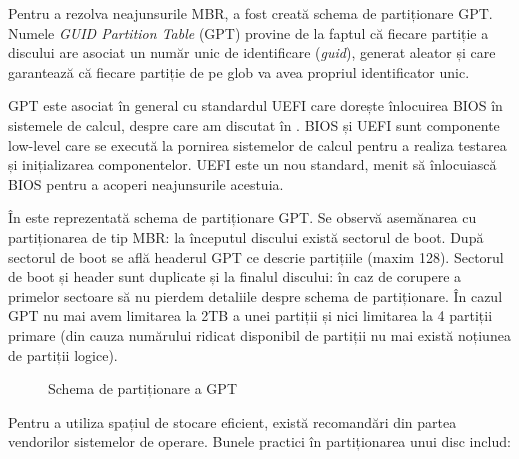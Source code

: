 Pentru a rezolva neajunsurile MBR, a fost creată schema de partiționare
GPT. Numele \textit{GUID Partition Table} (GPT) provine de la faptul că fiecare partiție a
discului are asociat un număr unic de identificare (\textit{guid}), generat aleator și
care garantează că fiecare partiție de pe glob va avea propriul identificator
unic.

GPT este asociat în general cu standardul UEFI care dorește înlocuirea
BIOS în sistemele de calcul, despre care am discutat în . BIOS și UEFI sunt componente low-level care
se execută la pornirea sistemelor de calcul pentru a realiza testarea și
inițializarea componentelor. UEFI este un nou standard, menit să înlocuiască
BIOS pentru a acoperi neajunsurile acestuia.

În  este reprezentată schema de
partiționare GPT. Se observă asemănarea cu partiționarea de tip MBR: la
începutul discului există sectorul de boot. După sectorul de boot se află headerul GPT ce descrie
partițiile (maxim 128). Sectorul de boot și header sunt duplicate și la finalul
discului: în caz de corupere a primelor sectoare să nu pierdem detaliile despre
schema de partiționare. În cazul GPT nu mai avem limitarea la 2TB a unei
partiții și nici limitarea la 4 partiții primare (din cauza numărului ridicat
disponibil de partiții nu mai există noțiunea de partiții logice).

\begin{figure}[htbp]
	\centering
	\def\svgwidth{\columnwidth}
        
	\caption{Schema de partiționare a GPT}
        \label{fig:storage:gpt}
\end{figure}

Pentru a utiliza spațiul de stocare eficient, există recomandări din partea
vendorilor sistemelor de operare. Bunele practici în partiționarea unui disc
includ:

